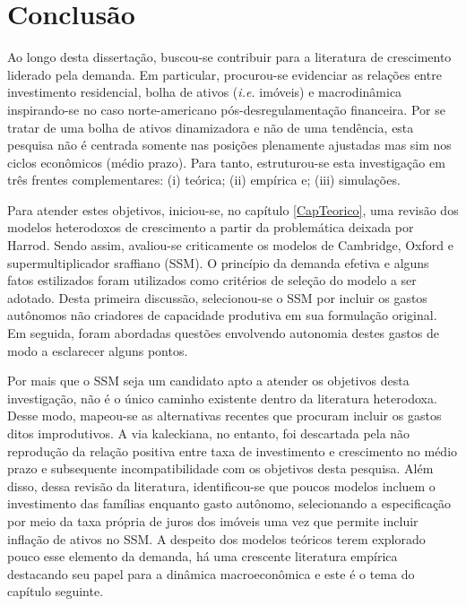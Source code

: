 \chapter{Conclusão}

Ao longo desta dissertação, buscou-se contribuir para a literatura de crescimento liderado pela demanda.
Em particular, procurou-se evidenciar as relações entre investimento residencial, bolha de ativos (\textit{i.e.} imóveis) e macrodinâmica inspirando-se no caso norte-americano pós-desregulamentação financeira.
Por se tratar de uma bolha de ativos dinamizadora e não de uma tendência, esta pesquisa não é centrada somente nas posições plenamente ajustadas mas sim nos ciclos econômicos (médio prazo).
Para tanto, estruturou-se esta investigação em três frentes complementares: (i) teórica; (ii) empírica e; (iii) simulações.



Para atender estes objetivos, iniciou-se, no capítulo \ref{CapTeorico}, uma revisão dos modelos heterodoxos de crescimento a partir da problemática deixada por Harrod.
Sendo assim, avaliou-se criticamente os modelos de Cambridge, Oxford e supermultiplicador sraffiano (SSM).
O princípio da demanda efetiva e alguns fatos estilizados foram utilizados como critérios de seleção do modelo a ser adotado.
Desta primeira discussão, selecionou-se o SSM por incluir os gastos autônomos não criadores de capacidade produtiva em sua formulação original.
Em seguida, foram abordadas questões envolvendo autonomia destes gastos de modo a esclarecer alguns pontos.

Por mais que o SSM seja um candidato apto a atender os objetivos desta investigação, não é o único caminho existente dentro da literatura heterodoxa.
Desse modo, mapeou-se as alternativas recentes que procuram incluir os gastos ditos improdutivos.
A via kaleckiana, no entanto, foi descartada pela não reprodução da relação positiva entre taxa de investimento e crescimento no médio prazo e subsequente incompatibilidade com os objetivos desta pesquisa.
Além disso, dessa revisão da literatura, identificou-se que poucos modelos incluem o investimento das famílias enquanto gasto autônomo, selecionando a especificação por meio  da taxa própria de juros dos imóveis uma vez que permite incluir inflação de ativos no  SSM.
A despeito dos modelos teóricos terem explorado pouco
esse elemento da demanda, há uma crescente literatura empírica destacando seu papel para a dinâmica macroeconômica e este é o tema do capítulo seguinte.


